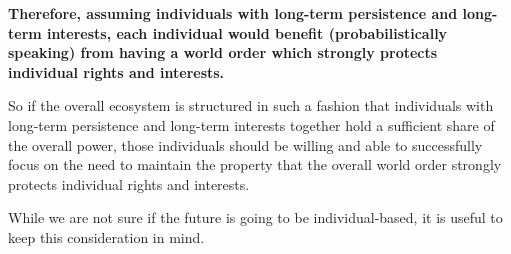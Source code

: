 \documentclass{article}
\begin{document}
{\bf Therefore, assuming individuals with long-term persistence and long-term interests, each
individual would benefit (probabilistically speaking) from having a world order which strongly protects individual rights and
interests.}

So if the overall ecosystem is structured in such a fashion that 
individuals with long-term persistence and long-term interests together
hold a sufficient share of the overall power, those individuals should be willing and able to
successfully focus on the need to maintain the property that the overall world order
strongly protects individual rights and interests.

While we are not sure if the future is going to be individual-based, it is useful to
keep this consideration in mind.
\end{document}
